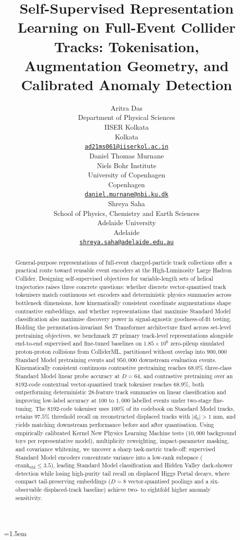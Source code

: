 \documentclass{article}
\title{Self-Supervised Representation Learning on Full-Event Collider Tracks: Tokenisation, Augmentation Geometry, and Calibrated Anomaly Detection}
\author{
 Aritra Das \\
  Department of Physical Sciences\\
  IISER Kolkata\\
  Kolkata \\
  \texttt{\href{mailto:ad21ms061@iiserkol.ac.in}{ad21ms061@iiserkol.ac.in}} \\
   \And
 Daniel Thomas Murnane \\
  Niels Bohr Institute\\
  University of Copenhagen\\
  Copenhagen \\
  \texttt{\href{mailto:daniel.murnane@nbi.ku.dk}{daniel.murnane@nbi.ku.dk}} \\
  \And
 Shreya Saha \\
  School of Physics, Chemistry and Earth Sciences\\
  Adelaide University\\
  Adelaide \\
  \texttt{\href{mailto:shreya.saha@adelaide.edu.au}{shreya.saha@adelaide.edu.au}} \\
}
\begin{document}
\emergencystretch=1.5em
\maketitle

\begin{abstract}
General-purpose representations of full-event charged-particle track collections offer a practical route toward reusable event encoders at the High-Luminosity Large Hadron Collider. Designing self-supervised objectives for variable-length sets of helical trajectories raises three concrete questions: whether discrete vector-quantised track tokenisers match continuous set encoders and deterministic physics summaries across bottleneck dimensions, how kinematically consistent coordinate augmentations shape contrastive embeddings, and whether representations that maximise Standard Model classification also maximise discovery power in signal-agnostic goodness-of-fit testing. Holding the permutation-invariant Set Transformer architecture fixed across set-level pretraining objectives, we benchmark 27 primary track-level representations alongside end-to-end supervised and fine-tuned baselines on $1.85\times 10^6$ zero-pileup simulated proton-proton collisions from ColliderML, partitioned without overlap into $900,000$ Standard Model pretraining events and $950,000$ downstream evaluation events. Kinematically consistent continuous contrastive pretraining reaches $68.0\%$ three-class Standard Model linear probe accuracy at $D=64$, and contrastive pretraining over an $8192$-code contextual vector-quantised track tokeniser reaches $68.9\%$, both outperforming deterministic 28-feature track summaries on linear classification and improving low-label accuracy at $100$ to $1,000$ labelled events under two-stage fine-tuning. The $8192$-code tokeniser uses $100\%$ of its codebook on Standard Model tracks, retains $97.5\%$ threshold recall on reconstructed displaced tracks with $|d_0| > 1\text{ mm}$, and yields matching downstream performance before and after quantisation. Using empirically calibrated Kernel New Physics Learning Machine tests ($10,000$ background toys per representative model), multiplicity reweighting, impact-parameter masking, and covariance whitening, we uncover a sharp task-metric trade-off: supervised Standard Model encoders concentrate variance into a low-rank subspace ($\text{erank}_{\text{SM}} \le 3.5$), leading Standard Model classification and Hidden Valley dark-shower detection while losing high-purity tail recall on displaced Higgs Portal decays, where compact tail-preserving embeddings ($D=8$ vector-quantised poolings and a six-observable displaced-track baseline) achieve two- to eightfold higher anomaly sensitivity.
\end{abstract}
\end{document}
